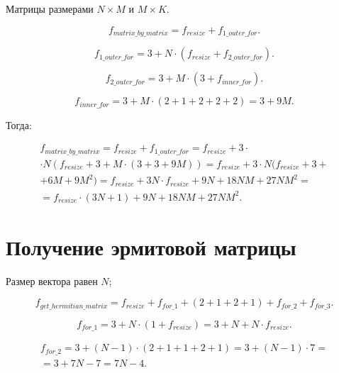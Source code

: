 Матрицы размерами $N \times M$ и $M \times K$.

\begin{equation}
	f_{matrix\_by\_matrix} = f_{resize} + f_{1\_outer\_for}.
\end{equation}

\begin{equation}
	f_{1\_outer\_for} = 3 + N \cdot (f_{resize} + f_{2\_outer\_for}).
\end{equation}

\begin{equation}
	f_{2\_outer\_for} = 3 + M \cdot (3 +  f_{inner\_for}).
\end{equation}

\begin{equation}
	f_{inner\_for} = 3 + M \cdot (2 + 1 + 2 + 2  + 2) = 3 + 9M.
\end{equation}

Тогда:

\begin{equation}
	\begin{gathered}
		f_{matrix\_by\_matrix} = f_{resize} + f_{1\_outer\_for} =
		f_{resize} + 3 \cdot \\ \cdot N (f_{resize} + 3 + M \cdot (3 + 3 + 9M)) = f_{resize} + 3 \cdot N (f_{resize} + 3 + \\ + 6M + 9M^2) = f_{resize} + 3N \cdot f_{resize} + 9N + 18NM + 27NM^2 = \\ = f_{resize} \cdot (3N + 1) + 9N + 18NM + 27NM^2.
	\end{gathered}
\end{equation}

\section{Получение эрмитовой матрицы}

Размер вектора равен $N$;

\begin{equation}
	f_{get\_hermitian\_matrix} = f_{resize} + f_{for\_1} + (2 + 1 + 2 + 1) + f_{for\_2} + f_{for\_3}.
\end{equation}

\begin{equation}
	f_{for\_1} = 3 + N \cdot (1 + f_{resize}) = 3 + N + N \cdot f_{resize}.
\end{equation}

\begin{equation}
	\begin{gathered}
		f_{for\_2} = 3 + (N - 1) \cdot (2 + 1 + 1 + 2 + 1) = 3 + (N - 1) \cdot 7 =\\=3 + 7N - 7 = 7N - 4.
	\end{gathered}
\end{equation}

